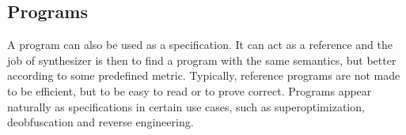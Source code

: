 \subsection{Programs}
\label{sec:programs}

A program can also be used as a specification. It can act as a reference and the
job of synthesizer is then to find a program with the same semantics, but better
according to some predefined metric. Typically, reference programs are not made
to be efficient, but to be easy to read or to prove correct. %
Programs appear naturally as specifications in certain use cases, such as
superoptimization, deobfuscation and reverse engineering. %

